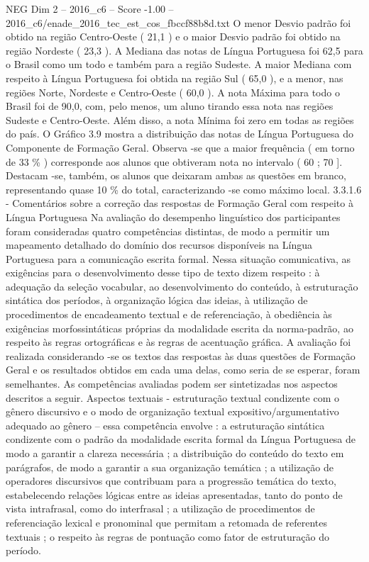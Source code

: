 \begin{textsample}{NEG Dim 2 – 2016\_c6 – Score -1.00 – 2016\_c6/enade\_2016\_tec\_est\_cos\_fbccf88b8d.txt}
O menor Desvio padrão foi obtido na região Centro-Oeste ( 21,1 ) e o maior Desvio padrão foi obtido na região Nordeste ( 23,3 ).
A Mediana das notas de Língua Portuguesa foi 62,5 para o Brasil como um todo e também para a região Sudeste.
A maior Mediana com respeito à Língua Portuguesa foi obtida na região Sul ( 65,0 ), e a menor, nas regiões Norte, Nordeste e Centro-Oeste ( 60,0 ).
A nota Máxima para todo o Brasil foi de 90,0, com, pelo menos, um aluno tirando essa nota nas regiões Sudeste e Centro-Oeste.
Além disso, a nota Mínima foi zero em todas as regiões do país.
O Gráfico 3.9 mostra a distribuição das notas de Língua Portuguesa do Componente de Formação Geral.
Observa -se que a maior frequência ( em torno de 33 \% ) corresponde aos alunos que obtiveram nota no intervalo ( 60 ; 70 ].
Destacam -se, também, os alunos que deixaram ambas as questões em branco, representando quase 10 \% do total, caracterizando -se como máximo local. 3.3.1.6 - Comentários sobre a correção das respostas de Formação Geral com respeito à Língua Portuguesa Na avaliação do desempenho linguístico dos participantes foram consideradas quatro competências distintas, de modo a permitir um mapeamento detalhado do domínio dos recursos disponíveis na Língua Portuguesa para a comunicação escrita formal.
Nessa situação comunicativa, as exigências para o desenvolvimento desse tipo de texto dizem respeito : à adequação da seleção vocabular, ao desenvolvimento do conteúdo, à estruturação sintática dos períodos, à organização lógica das ideias, à utilização de procedimentos de encadeamento textual e de referenciação, à obediência às exigências morfossintáticas próprias da modalidade escrita da norma-padrão, ao respeito às regras ortográficas e às regras de acentuação gráfica.
A avaliação foi realizada considerando -se os textos das respostas às duas questões de Formação Geral e os resultados obtidos em cada uma delas, como seria de se esperar, foram semelhantes.
As competências avaliadas podem ser sintetizadas nos aspectos descritos a seguir.
Aspectos textuais - estruturação textual condizente com o gênero discursivo e o modo de organização textual expositivo/argumentativo adequado ao gênero – essa competência envolve : a estruturação sintática condizente com o padrão da modalidade escrita formal da Língua Portuguesa de modo a garantir a clareza necessária ; a distribuição do conteúdo do texto em parágrafos, de modo a garantir a sua organização temática ; a utilização de operadores discursivos que contribuam para a progressão temática do texto, estabelecendo relações lógicas entre as ideias apresentadas, tanto do ponto de vista intrafrasal, como do interfrasal ; a utilização de procedimentos de referenciação lexical e pronominal que permitam a retomada de referentes textuais ; o respeito às regras de pontuação como fator de estruturação do período.

\end{textsample}
